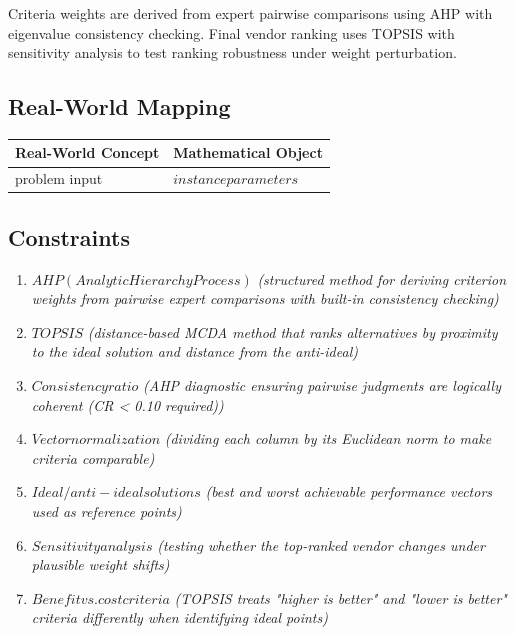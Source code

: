 \documentclass[11pt, a4paper]{article}
\begin{document}
Criteria weights are derived from expert pairwise comparisons using AHP with eigenvalue consistency checking. Final vendor ranking uses TOPSIS with sensitivity analysis to test ranking robustness under weight perturbation.

\subsection{Real-World Mapping}

\begin{longtable}{ll}
\toprule
\textbf{Real-World Concept} & \textbf{Mathematical Object} \\
\midrule
\endhead
problem input & $instance parameters$ \\
\bottomrule
\end{longtable}

\subsection{Constraints}

\begin{enumerate}
  \item $AHP (Analytic Hierarchy Process)$
  \hfill \textit{(structured method for deriving criterion weights from pairwise expert comparisons with built-in consistency checking)}
  \item $TOPSIS$
  \hfill \textit{(distance-based MCDA method that ranks alternatives by proximity to the ideal solution and distance from the anti-ideal)}
  \item $Consistency ratio$
  \hfill \textit{(AHP diagnostic ensuring pairwise judgments are logically coherent (CR < 0.10 required))}
  \item $Vector normalization$
  \hfill \textit{(dividing each column by its Euclidean norm to make criteria comparable)}
  \item $Ideal/anti-ideal solutions$
  \hfill \textit{(best and worst achievable performance vectors used as reference points)}
  \item $Sensitivity analysis$
  \hfill \textit{(testing whether the top-ranked vendor changes under plausible weight shifts)}
  \item $Benefit vs. cost criteria$
  \hfill \textit{(TOPSIS treats "higher is better" and "lower is better" criteria differently when identifying ideal points)}
\end{enumerate}
\end{document}
